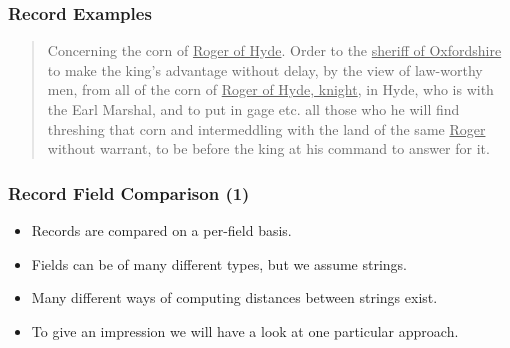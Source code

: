 \documentclass[12pt]{beamer}
\theoremstyle{break}
\begin{document}
\begin{frame}
	\frametitle{Record Examples}
	
	\begin{quote}
		\footnotesize
		Concerning the corn of \underline{Roger of Hyde}. Order to the \underline{sheriff of Oxfordshire} to make the king’s advantage without delay, by the view of law-worthy men, from all of the corn of \underline{Roger of Hyde, knight}, in Hyde, who is with the Earl Marshal, and to put in gage etc. all those who he will find threshing that corn and intermeddling with the land of the same \underline{Roger} without warrant, to be before the king at his command to answer for it.
	\end{quote}
	
	\begin{table}
		\footnotesize
		\centering
		
	\end{table}
	
\end{frame}




\begin{frame}
	\frametitle{Record Field Comparison (1)}
	
	\begin{itemize}
		\item Records are compared on a per-field basis.
		\item Fields can be of many different types, but we assume strings.
		\item Many different ways of computing distances between strings exist.
		\item To give an impression we will have a look at one particular approach.
	\end{itemize}
	
\end{frame}


\end{document}
